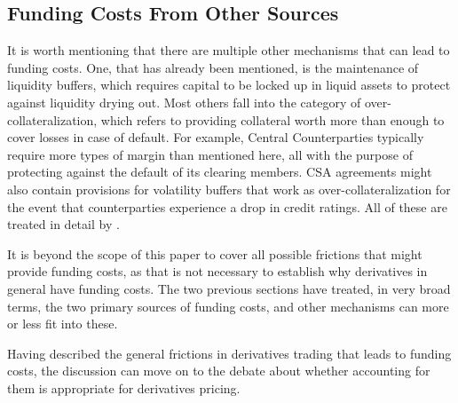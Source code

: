 \documentclass[main.tex]{subfiles}
\begin{document}
    \subsection{Funding Costs From Other Sources}
        It is worth mentioning that there are multiple other mechanisms 
        that can lead to funding costs.
        One, that has already been mentioned, is the maintenance of liquidity buffers,
        which requires capital to be locked up in liquid assets
        to protect against liquidity drying out.
        Most others fall into the category of over-collateralization,
        which refers to providing collateral 
        worth more than enough to cover losses in case of default.
        For example, 
        Central Counterparties typically require more types of margin than mentioned here,
        all with the purpose of protecting against the default of its clearing members.
        CSA agreements might also contain provisions for volatility buffers
        that work as over-collateralization 
        for the event that counterparties experience a drop in credit ratings.
        All of these are treated in detail by \textcite[Chapter 10]{Green2015XVA}.

        It is beyond the scope of this paper to cover all possible frictions 
        that might provide funding costs, 
        as that is not necessary to establish why derivatives in general have funding costs.
        The two previous sections have treated, in very broad terms, 
        the two primary sources of funding costs, 
        and other mechanisms can more or less fit into these.

        Having described the general frictions in derivatives trading that leads to funding costs,
        the discussion can move on to the debate about 
        whether accounting for them is appropriate for derivatives pricing.
\end{document}
